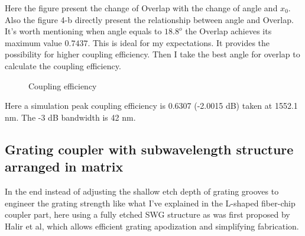 \documentclass[]{article}
\begin{document}
Here the figure present the change of Overlap with the change of angle and $x_0$. Also the figure 4-b directly present the relationship between angle and Overlap. It's worth mentioning when angle equals to $18.8^o$ the Overlap achieves its maximum value $0.7437$. This is ideal for my expectations. It provides the possibility for higher coupling efficiency. Then I take the best angle for overlap to calculate the coupling efficiency.

\begin{figure}[H]
	\centering
	\caption{Coupling efficiency}
	\label{fig:figure5}
\end{figure}

Here a simulation peak coupling efficiency is 0.6307 (-2.0015 dB) taken at 1552.1 nm. The -3 dB bandwidth is 42 nm.

\subsection{Grating coupler with subwavelength structure arranged in matrix}
In the end instead of adjusting the shallow etch depth of grating grooves to engineer the grating strength like what I've explained in the L-shaped fiber-chip coupler part, here using a fully etched SWG structure as was first proposed by Halir et al, which allows efficient grating apodization and simplifying fabrication.
\end{document}
